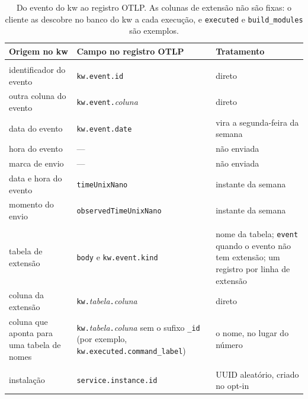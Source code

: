 \begin{table}[!ht]
  \centering
  \footnotesize
  \setlength{\tabcolsep}{4pt}
  \begin{threeparttable}
    \caption{Do evento do kw ao registro OTLP. As colunas de extensão não são
      fixas: o cliente as descobre no banco do kw a cada execução, e
      \texttt{executed} e \texttt{build\_modules} são exemplos.}
    \label{tab:mapeamento}
    \begin{tabular}{@{}>{\raggedright\arraybackslash}p{4.0cm}
                      >{\raggedright\arraybackslash}p{5.0cm}
                      >{\raggedright\arraybackslash}p{5.2cm}@{}}
      \toprule
      Origem no kw & Campo no registro OTLP & Tratamento \\
      \midrule
      \multicolumn{3}{@{}l}{\textit{Evento}} \\*
      \addlinespace[1pt]
      identificador do evento & \texttt{kw.event.id} & direto \\
      outra coluna do evento & \texttt{kw.event.}\textit{coluna} & direto \\
      data do evento & \texttt{kw.event.date} & vira a segunda-feira da semana \\
      hora do evento & --- & não enviada \\
      marca de envio & --- & não enviada \\
      data e hora do evento & \texttt{timeUnixNano} & instante da semana \\
      momento do envio & \texttt{observedTimeUnixNano} & instante da semana \\
      \midrule
      \multicolumn{3}{@{}l}{\textit{Extensões (descobertas no banco do kw)}} \\*
      \addlinespace[1pt]
      tabela de extensão & \texttt{body} e \texttt{kw.event.kind}
        & nome da tabela; \texttt{event} quando o evento não tem extensão;
          um registro por linha de extensão \\
      coluna da extensão & \texttt{kw.}\textit{tabela}\texttt{.}\textit{coluna} & direto \\
      coluna que aponta para uma tabela de nomes
        & \texttt{kw.}\textit{tabela}\texttt{.}\textit{coluna} sem o sufixo \texttt{\_id}
          (por exemplo, \texttt{kw.executed.command\_label})
        & o nome, no lugar do número \\
      \midrule
      \multicolumn{3}{@{}l}{\textit{Recurso (um por envio)}} \\*
      \addlinespace[1pt]
      instalação & \texttt{service.instance.id} & UUID aleatório, criado no opt-in \\

\end{tabular}
\end{threeparttable}
\end{table}
